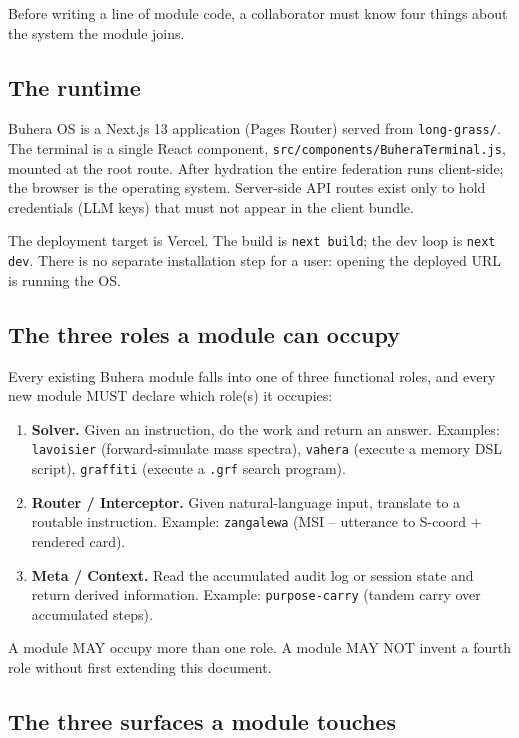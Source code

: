 \documentclass[11pt,a4paper]{article}
\theoremstyle{contract}
\begin{document}
Before writing a line of module code, a collaborator must know four
things about the system the module joins.

\subsection{The runtime}

Buhera OS is a Next.js 13 application (Pages Router) served from
\texttt{long-grass/}. The terminal is a single React component,
\texttt{src/components/BuheraTerminal.js}, mounted at the root route.
After hydration the entire federation runs client-side; the browser is
the operating system. Server-side API routes exist only to hold
credentials (LLM keys) that must not appear in the client bundle.

The deployment target is Vercel. The build is \texttt{next build}; the
dev loop is \texttt{next dev}. There is no separate installation step
for a user: opening the deployed URL is running the OS.

\subsection{The three roles a module can occupy}

Every existing Buhera module falls into one of three functional roles,
and every new module MUST declare which role(s) it occupies:

\begin{enumerate}[leftmargin=1.6em,itemsep=2pt]
\item \textbf{Solver.} Given an instruction, do the work and return an
answer. Examples: \texttt{lavoisier} (forward-simulate mass spectra),
\texttt{vahera} (execute a memory DSL script), \texttt{graffiti}
(execute a \texttt{.grf} search program).
\item \textbf{Router / Interceptor.} Given natural-language input,
translate to a routable instruction. Example: \texttt{zangalewa} (MSI --
utterance to S-coord + rendered card).
\item \textbf{Meta / Context.} Read the accumulated audit log or session
state and return derived information. Example: \texttt{purpose-carry}
(tandem carry over accumulated steps).
\end{enumerate}

A module MAY occupy more than one role. A module MAY NOT invent a
fourth role without first extending this document.

\subsection{The three surfaces a module touches}
\end{document}
